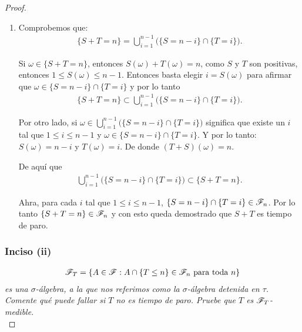 \begin{proof}
\begin{enumerate}
				Por último, ${\{ T \leq n \} \in \F_n}$ y ${\{ S \leq n \} \in \F_n}$. Por lo tanto	\\	
				${\{ T \leq n \} \cap \{ S \leq n\} = \{ S \vee T \leq n \} \in \F_n}$ y con esto demostramos que 
				${ S \vee T}$ es tiempo de paro.\\
				
			\item
				Comprobemos que:
				\begin{align}
					\{ S + T = n \} = \bigcup_{i = 1}^{n-1} \bigg( \{S = n - i\} \cap \{T = i\} \bigg).
				\end{align}
				
				Si ${\omega \in \{ S + T = n \}}$, entonces ${S(\omega) + T(\omega) = n}$, como ${S}$ y ${T}$ son positivas,
				entonces ${1 \leq S(\omega) \leq n-1}$. Entonces basta elegir ${i = S(\omega)}$ para afirmar que 
				${\omega \in \{S = n - i\} \cap \{T = i\}}$ y por lo tanto
				\begin{align}
				\{ S + T = n \} \subset \bigcup_{i = 1}^{n-1} \bigg( \{S = n - i\} \cap \{T = i\} \bigg).
				\end{align}
				
				Por otro lado, si ${\omega \in \bigcup_{i = 1}^{n-1} \bigg( \{S = n - i\} \cap \{T = i\} \bigg)}$
				significa que existe un ${i}$ tal que ${1\leq i \leq n-1}$ y ${\omega \in \{S = n - i\} \cap \{T = i\}}$.
				Y por lo tanto: ${S(\omega) = n-i}$ y ${T(\omega) = i}$. De donde ${(T + S)(\omega) = n}$.
				
				De aquí que
				\begin{align}
					\bigcup_{i = 1}^{n-1} \bigg( \{S = n - i\} \cap \{T = i\} \bigg) \subset \{ S + T = n \}. 
				\end{align}
				
				Ahra, para cada ${i}$ tal que ${1 \leq i \leq n-1}$, ${\{S = n - i\} \cap \{T = i\} \in \mathscr{F}_n}$.
				Por lo tanto ${\{ S + T = n\} \in \mathscr{F}_n}$ y con esto queda demostrado que ${ S + T }$ es tiempo de paro.
		\end{enumerate}
		
	\subsubsection{Inciso (ii)}
	\emph{
		\begin{align}
			\mathscr{F}_T=\left\{ A\in\mathscr{F}:A\cap\left\{ T\leq n\right\} \in\mathscr{F}_n\text{ para toda } n\right\} 
		\end{align}
		es una ${\sigma}$-\'algebra, 
		a la que nos referimos como la ${\sigma}$-\'algebra detenida en ${\tau}$. Comente qu\'e puede fallar si ${T}$ no es tiempo de paro. 
		Pruebe que ${T}$ es ${\mathscr{F}_T}$-medible.\\		
	}			
			

\end{proof}

